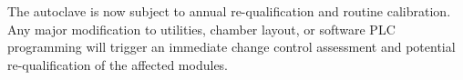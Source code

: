 \vspace{0.4cm}
\begin{notebox}
The autoclave is now subject to annual re-qualification and routine calibration. Any major modification to utilities, chamber layout, or software PLC programming will trigger an immediate change control assessment and potential re-qualification of the affected modules.
\end{notebox}
